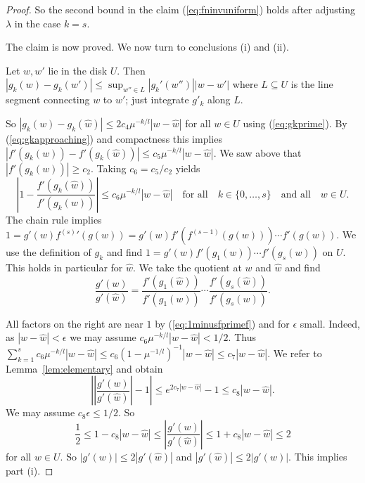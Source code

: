 \documentclass[10pt,a4paper]{amsart}
\newcommand{\varz}{w}
\renewcommand{\subset}{\subseteq}
\begin{document}
\begin{proof}
  So the second bound in the claim (\ref{eq:fninvuniform}) holds after
  adjusting $\lambda$ in the case $k=s$.

  The claim is now proved. We now turn to conclusions (i) and (ii). 

  Let $w,w'$ lie in the disk $U$. 
  Then $|g_k(w)-g_k(w')| \le \sup_{w''\in L} |g_k'(w'')|
  |w- w'|$ where $L\subset U$ is the line segment connecting
  $w$ to $w'$; just integrate $g'_k$ along $L$. 

  So $|g_k(\varz)-g_k(\widehat{\varz})|\le 2c_4
  \mu^{-k/l} |\varz- \widehat{\varz}|$ for all $\varz\in U$
  using (\ref{eq:gkprime}). 
  By (\ref{eq:gkapproaching}) and compactness this implies
  $|f'(g_k(\varz))-f'(g_k( \widehat{\varz}))| \le c_5 \mu^{-k/l}|\varz- \widehat{\varz}|$.
  We saw above that $|f'(g_k(w))|\ge c_2$. Taking $c_6=c_5/c_2$ yields
  \begin{equation}
    \label{eq:1minusfprimef}
    \left|1-\frac{f'(g_k( \widehat{\varz}))}{f'(g_k(\varz))}\right|\le c_6
    \mu^{-k/l}|\varz- \widehat{\varz}|\quad\text{for all}\quad k\in
    \{0,\ldots,s\}\quad\text{and all}\quad w\in U.
  \end{equation}
  The chain rule implies $1 = g'(w) {f^{(s)}}'(g(w)) = g'(w)
  f'(f^{(s-1)}(g(w)))\cdots f'(g(w))$. We use the
  definition of $g_k$ and find
  $1 = g'(w)f'(g_1(w)) \cdots f'(g_s(w))$ on $U$.
  This holds in particular for $\widehat w$.
  We take the
  quotient at $\varz$ and $ \widehat{\varz}$ and find  
  \begin{equation*}
    \frac{g'(\varz)}{g'( \widehat{\varz})} = \frac{f'(g_1( \widehat{\varz}))}{f'(g_1(\varz))} \cdots \frac{f'(g_s( \widehat{\varz}))}{f'(g_s(\varz))}.
  \end{equation*}

  All factors on the right are near $1$ by   (\ref{eq:1minusfprimef})
  and for $\epsilon$ small.
  Indeed, as $|w-\widehat w |<\epsilon$ we may assume
  $c_6\mu^{-k/l}|w-\widehat w|< 1/2$.
  Thus $\sum_{k=1}^{s} c_6\mu^{-k/l}|w-\widehat w|
  \le {c_6}(1-\mu^{-1/l})^{-1}|w-\widehat w|\le c_7 |w-\widehat w|$. We
  refer to Lemma~\ref{lem:elementary} and obtain
  \begin{equation*}
    \left|\left|\frac{g'(\varz)}{g'( \widehat{\varz})}\right|-1\right|
    \le e^{2c_7|w-\widehat w|}-1\le c_8|\varz- \widehat{\varz}|.
  \end{equation*}
  We may assume $c_8\epsilon \le 1/2$.
  So 
  $$\frac 12 \le 1-c_8|\varz-\widehat{\varz}|\le
  \left|\frac{g'(\varz)}{g'(\widehat{\varz})}\right| \le
  1+c_8|\varz-\widehat{\varz}|\le 2$$
  for all $\varz\in U$.
  So $|g'(\varz)|\le 2  |g'(\widehat{\varz})|$ and
  $|g'(\widehat\varz)|\le 2 |g'({\varz})|$.
  This implies part (i).


\end{proof}
\end{document}
